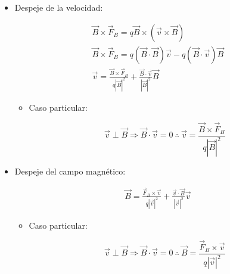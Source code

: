 \documentclass[a4paper,10pt]{article}
\begin{document}
\begin{itemize}

\item Despeje de la velocidad:

\begin{gather*}
    \vec{B}\times\vec{F}_{B}
    =q\vec{B}\times\left(\vec{v}\times\vec{B}\right)
    \\
    \vec{B}\times\vec{F}_{B}
    =q\left(\vec{B}\cdot\vec{B}\right)\vec{v}
    -q\left(\vec{B}\cdot\vec{v}\right)\vec{B}
    \\
    \boxed{
    \vec{v}=\frac{\vec{B}\times\vec{F}_{B}}{q|\vec{B}|^2}
    +\frac{\vec{B}\cdot\vec{v}}{|\vec{B}|^2}\vec{B}
    }
\end{gather*}

    \begin{itemize}
    
    \item Caso particular:
    
    \begin{equation*}
        \vec{v}\perp\vec{B}\Rightarrow\vec{B}\cdot\vec{v}=0
        \:\therefore\:
        \boxed{
            \vec{v}=\frac{\vec{B}\times\vec{F}_{B}}{q|\vec{B}|^2}    
            }
    \end{equation*}
        
    \end{itemize}

\item Despeje del campo magnético:

\begin{gather*}
    \boxed{
    \vec{B}=\frac{\vec{F}_{B}\times\vec{v}}{q\left\lvert\vec{v}\right\lvert^2}
    +\frac{\vec{v}\cdot\vec{B}}{\left\lvert\vec{v}\right\lvert^2}\vec{v}
    }
\end{gather*}

    \begin{itemize}
    
    \item Caso particular:
    
    \begin{equation*}
        \vec{v}\perp\vec{B}\Rightarrow\vec{B}\cdot\vec{v}=0
        \:\therefore\:
        \boxed{
        \vec{B}=\frac{\vec{F}_{B}\times\vec{v}}{q\left\lvert\vec{v}\right\lvert^2}    
        }
    \end{equation*}

    \end{itemize}

\end{itemize}
\end{document}
